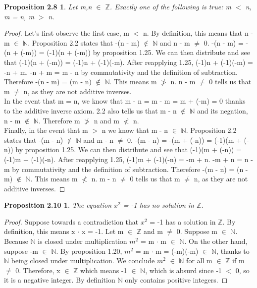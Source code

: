 \documentclass[12pt]{amsart}
\newcommand{\N}{\mathbb{N}}
\newcommand{\Z}{\mathbb{Z}}
\begin{document}
\newtheorem*{prop2.8}{Proposition 2.8}
\begin{prop2.8}
Let m,n $\in$ $\Z$. Exactly one of the following is true: m $<$ n, m = n, m $>$ n.
\end{prop2.8}

\begin{proof}
	Let's first observe the first case, m $<$ n. By definition, this means that n - m $\in$ $\N$. Proposition 2.2 states that -(n - m) $\notin$ $\N$ and n - m $\neq$ 0.
-(n - m) = -(n + (-m)) = (-1)(n + (-m)) by proposition 1.25. We can then distribute
and see that (-1)(n + (-m)) = (-1)n + (-1)(-m). After reapplying 1.25, (-1)n + (-1)(-m)
 = -n + m. -n + m = m - n by commutativity and the definition of subtraction. 
Therefore -(n - m) = (m - n) $\notin$ $\N$. This means m $\ngtr$ n. n - m $\neq$ 0 
tells us that m $\neq$ n, as they are not additive inverses.
	\\\indent In the event that m = n, we know that m - n = m - m = m + (-m) = 0 thanks to the additive inverse axiom. 2.2 also tells us that 
 m - n $\notin$ $\N$ and its negation, n - m $\notin$ $\N$. Therefore m $\ngtr$ n and m $\nless$ n.
	\\\indent Finally, in the event that m $>$ n we know that m - n $\in$ $\N$. Proposition 2.2 states that -(m - n) $\notin$ $\N$ and m - n $\neq$ 0.
-(m - n) = -(m + (-n)) = (-1)(m + (-n)) by proposition 1.25. We can then distribute
and see that (-1)(m + (-n)) = (-1)m + (-1)(-n). After reapplying 1.25, (-1)m + (-1)(-n)
 = -m + n. -m + n = n - m by commutativity and the definition of subtraction. 
Therefore -(m - n) = (n - m) $\notin$ $\N$. This means m $\nless$ n. m - n $\neq$ 0 
tells us that m $\neq$ n, as they are not additive inverses.
\end{proof}
\newtheorem*{prop2.10}{Proposition 2.10}
\begin{prop2.10}
The equation $x^{2}$ = -1 has no solution in $\Z$.
\end{prop2.10}

\begin{proof}
	Suppose towards a contradiction that $x^{2}$ = -1 has a solution in $\Z$. By definition, this means x $\cdot$ x = -1. Let m $\in$ $\Z$ and m $\neq$ 0. Suppose m $\in$ $\N$. Because $\N$ is closed under multiplication $m^{2}$ = m $\cdot$ m $\in$ $\N$. On the other hand, suppose -m $\in$ $\N$. By proposition 1.20, $m^{2}$ = m $\cdot$ m = (-m)(-m) $\in$ $\N$, thanks to $\N$ being closed under multiplication. We conclude $m^{2}$ $\in$ $\N$ for all m $\in$ $\Z$ if m $\neq$ 0. Therefore, x $\in$ $\Z$ which means -1 $\in$ $\N$, which is absurd since -1 $<$ 0, so it is a negative integer. By definition $\N$ only contains positive integers.
\end{proof}
\end{document}

